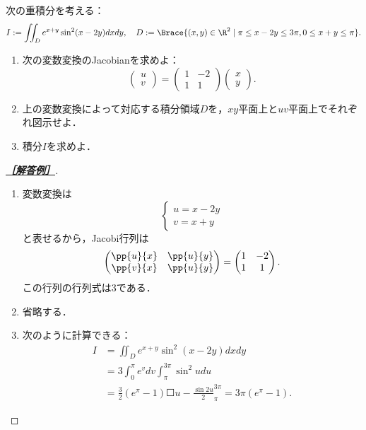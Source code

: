 \documentclass[uplatex,dvipdfmx]{jsarticle}
\begin{document}
\begin{tcolorbox}[colframe=ForestGreen, colback=ForestGreen!10!white,breakable,colbacktitle=ForestGreen!40!white,coltitle=black,fonttitle=\bfseries\sffamily,
    title=第２問]
    \begin{problem}
        次の重積分を考える：
    \[I:=\iint_De^{x+y}\sin^2(x-2y)dxdy,\quad D:=\Brace{(x,y)\in\R^2\mid\pi\le x-2y\le 3\pi,0\le x+y\le\pi}.\]
    \begin{enumerate}
        \item 次の変数変換のJacobianを求めよ：
        \[\begin{pmatrix}u\\v\end{pmatrix}=\begin{pmatrix}1&-2\\1&1\end{pmatrix}\begin{pmatrix}x\\y\end{pmatrix}.\]
        \item 上の変数変換によって対応する積分領域$D$を，$xy$平面上と$uv$平面上でそれぞれ図示せよ．
        \item 積分$I$を求めよ．
    \end{enumerate}
    \end{problem}
\end{tcolorbox}
\begin{proof}[\textbf{\underline{［解答例］}}]\mbox{}
    \begin{enumerate}
        \item 変数変換は
        \[\begin{cases}
            u=x-2y\\
            v=x+y
        \end{cases}\]
        と表せるから，Jacobi行列は
        \[\begin{pmatrix}\pp{u}{x}&\pp{u}{y}\\\pp{v}{x}&\pp{u}{y}\end{pmatrix}=\begin{pmatrix}1&-2\\1&1\end{pmatrix}.\]
        この行列の行列式は3である．
        \item 省略する．
        \item 次のように計算できる：
        \begin{align*}
            I&=\iint_De^{x+y}\sin^2(x-2y)dxdy\\
            &=3\int^\pi_0 e^vdv\int^{3\pi}_\pi\sin^2udu\\
            &=\frac{3}{2}(e^\pi-1)\Square{u-\frac{\sin2 u}{2}}^{3\pi}_\pi=3\pi(e^\pi-1).
        \end{align*}
    \end{enumerate}
\end{proof}
\end{document}
